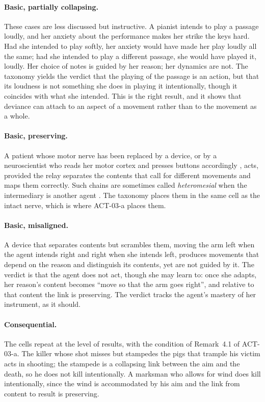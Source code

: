 \documentclass{situationist-preprint}
\begin{document}
\paragraph{Basic, partially collapsing.} These cases are less discussed but instructive. A pianist intends to play a passage loudly, and her anxiety about the performance makes her strike the keys hard. Had she intended to play softly, her anxiety would have made her play loudly all the same; had she intended to play a different passage, she would have played it, loudly. Her choice of notes is guided by her reason; her dynamics are not. The taxonomy yields the verdict that the playing of the passage is an action, but that its loudness is not something she does in playing it intentionally, though it coincides with what she intended. This is the right result, and it shows that deviance can attach to an aspect of a movement rather than to the movement as a whole.

\paragraph{Basic, preserving.} A patient whose motor nerve has been replaced by a device, or by a neuroscientist who reads her motor cortex and presses buttons accordingly \citep{Peacocke1979}, acts, provided the relay separates the contents that call for different movements and maps them correctly. Such chains are sometimes called \emph{heteromesial} when the intermediary is another agent \citep{Bishop1989}. The taxonomy places them in the same cell as the intact nerve, which is where ACT-03-a places them.

\paragraph{Basic, misaligned.} A device that separates contents but scrambles them, moving the arm left when the agent intends right and right when she intends left, produces movements that depend on the reason and distinguish its contents, yet are not guided by it. The verdict is that the agent does not act, though she may learn to: once she adapts, her reason's content becomes \enquote{move so that the arm goes right}, and relative to that content the link is preserving. The verdict tracks the agent's mastery of her instrument, as it should.

\paragraph{Consequential.} The cells repeat at the level of results, with the condition of Remark~4.1 of ACT-03-a. The killer whose shot misses but stampedes the pigs that trample his victim \citep{Davidson1973} acts in shooting; the stampede is a collapsing link between the aim and the death, so he does not kill intentionally. A marksman who allows for wind does kill intentionally, since the wind is accommodated by his aim and the link from content to result is preserving.
\end{document}
